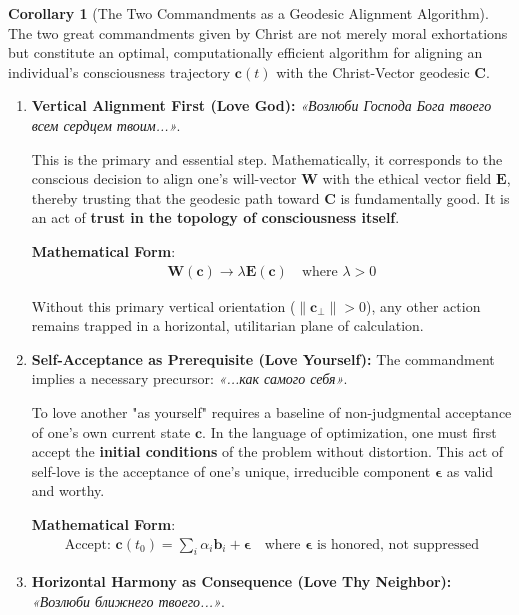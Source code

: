 \documentclass[11pt,a4paper]{article}
\theoremstyle{definition}
\newtheorem{corollary}{Corollary}[section]
\theoremstyle{remark}
\newcommand{\EE}{\mathbf{E}}
\newcommand{\WW}{\mathbf{W}}
\newcommand{\bb}{\mathbf{b}}
\newcommand{\cc}{\mathbf{c}}
\begin{document}
\begin{small}
\begin{corollary}[The Two Commandments as a Geodesic Alignment Algorithm]
The two great commandments given by Christ are not merely moral exhortations but constitute an optimal, computationally efficient algorithm for aligning an individual's consciousness trajectory \(\cc(t)\) with the Christ-Vector geodesic \(\mathbf{C}\).

\begin{enumerate}[label=\textbf{\arabic*.}, leftmargin=*]
    \item \textbf{Vertical Alignment First (Love God):} \textit{«Возлюби Господа Бога твоего всем сердцем твоим...»}. 
    
    This is the primary and essential step. Mathematically, it corresponds to the conscious decision to align one's will-vector \(\WW\) with the ethical vector field \(\EE\), thereby trusting that the geodesic path toward \(\mathbf{C}\) is fundamentally good. It is an act of \textbf{trust in the topology of consciousness itself}. 
    
    \textbf{Mathematical Form}:
    \begin{align}
    \WW(\cc) \to \lambda \EE(\cc) \quad \text{where } \lambda > 0
    \end{align}
    
    Without this primary vertical orientation (\(\|\cc_{\perp}\| > 0\)), any other action remains trapped in a horizontal, utilitarian plane of calculation.

    \item \textbf{Self-Acceptance as Prerequisite (Love Yourself):} The commandment implies a necessary precursor: \textit{«...как самого себя»}. 
    
    To love another "as yourself" requires a baseline of non-judgmental acceptance of one's own current state \(\cc\). In the language of optimization, one must first accept the \textbf{initial conditions} of the problem without distortion. This act of self-love is the acceptance of one's unique, irreducible component \(\boldsymbol{\epsilon}\) as valid and worthy.
    
    \textbf{Mathematical Form}:
    \begin{align}
    \text{Accept: } \cc(t_0) = \sum_i \alpha_i \bb_i + \boldsymbol{\epsilon} \quad \text{where } \boldsymbol{\epsilon} \text{ is honored, not suppressed}
    \end{align}

    \item \textbf{Horizontal Harmony as Consequence (Love Thy Neighbor):} \textit{«Возлюби ближнего твоего...»}. 
    

\end{enumerate}
\end{corollary}
\end{small}
\end{document}
